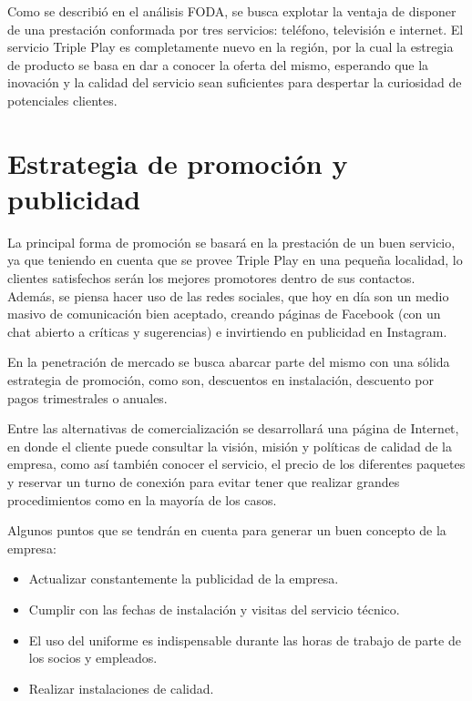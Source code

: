 \documentclass[12pt,a4paper]{book}
\begin{document}
Como se describió en el análisis FODA, se busca explotar la ventaja de disponer de una prestación conformada por tres servicios: teléfono, televisión e internet. El servicio Triple Play es completamente nuevo en la región, por la cual la estregia de producto se basa en dar a conocer la oferta del mismo, esperando que la inovación y la calidad del servicio sean suficientes para despertar la curiosidad de potenciales clientes.

\section{Estrategia de promoción y publicidad}\label{sec_estrategia_publicidad_Pnegocio}

La principal forma de promoción se basará en la prestación de un buen servicio, ya que teniendo en cuenta que se provee Triple Play en una pequeña localidad, lo clientes satisfechos serán los mejores promotores dentro de sus contactos. Además, se piensa hacer uso de las redes sociales, que hoy en día son un medio masivo de comunicación bien aceptado, creando páginas de Facebook (con un chat abierto a críticas y sugerencias) e  invirtiendo en publicidad en Instagram. 

En la penetración de mercado se busca abarcar parte del mismo con una sólida estrategia de promoción, como son, descuentos en instalación, descuento por pagos trimestrales o anuales.

Entre las alternativas de comercialización se desarrollará una página de Internet, en donde el cliente puede consultar la visión, misión y políticas de calidad de la empresa, como así también conocer el servicio, el precio de los diferentes paquetes y reservar un turno de conexión para evitar tener que realizar grandes procedimientos como en la mayoría de los casos.

Algunos puntos que se tendrán en cuenta para generar un buen concepto de la empresa:

\begin{itemize}
\item Actualizar constantemente la publicidad de la empresa.
\item Cumplir con las fechas de instalación y visitas del servicio técnico.
\item El uso del uniforme es indispensable durante las horas de trabajo de parte de los socios y empleados.
\item Realizar instalaciones de calidad.
\end{itemize}
\end{document}
